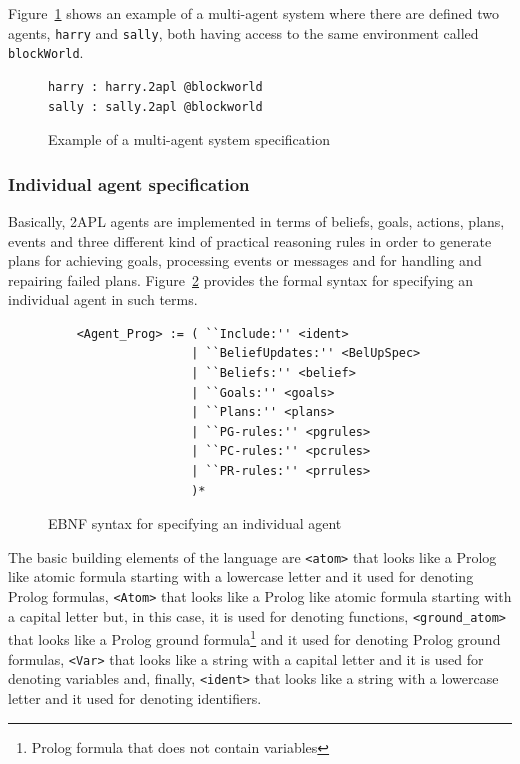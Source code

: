 \documentclass[a4paper]{article}
\begin{document}
Figure~\ref{fig:ex_blockworld} shows an example of a multi-agent system where there are defined two agents, \texttt{harry} and \texttt{sally}, both having access to the same environment called \texttt{blockWorld}.

\begin{figure}[htbp]
\begin{verbatim}
harry : harry.2apl @blockworld
sally : sally.2apl @blockworld
\end{verbatim}
\caption{Example of a multi-agent system specification}
\label{fig:ex_blockworld}
\end{figure}

\subsubsection{Individual agent specification} %

% 

Basically, 2APL agents are implemented in terms of beliefs, goals, actions, plans, events and three different kind of practical reasoning rules in order to generate plans for achieving goals, processing events or messages and for handling and repairing failed plans. Figure~\ref{fig:ebnf_agent} provides the formal syntax for specifying an individual agent in such terms.

\begin{figure}[htp]
\begin{verbatim}
	<Agent_Prog> := ( ``Include:'' <ident>
	                | ``BeliefUpdates:'' <BelUpSpec>
	                | ``Beliefs:'' <belief> 
	                | ``Goals:'' <goals> 
	                | ``Plans:'' <plans>
	                | ``PG-rules:'' <pgrules>
	                | ``PC-rules:'' <pcrules>
	                | ``PR-rules:'' <prrules>
	                )*
\end{verbatim}
\caption{EBNF syntax for specifying an individual agent}
\label{fig:ebnf_agent}
\end{figure}

The basic building elements of the language are \texttt{<atom>} that looks like a Prolog like atomic formula starting with a lowercase letter and it used for denoting Prolog formulas, \texttt{<Atom>} that looks like a Prolog like atomic formula starting with a capital letter but, in this case, it is used for denoting functions, \texttt{<ground\_atom>} that looks like a Prolog ground formula\footnote{Prolog formula that does not contain variables} and it used for denoting Prolog ground formulas, \texttt{<Var>} that looks like a string with a capital letter and it is used for denoting variables and, finally, \texttt{<ident>} that looks like a string with a lowercase letter and it used for denoting identifiers.
\end{document}
